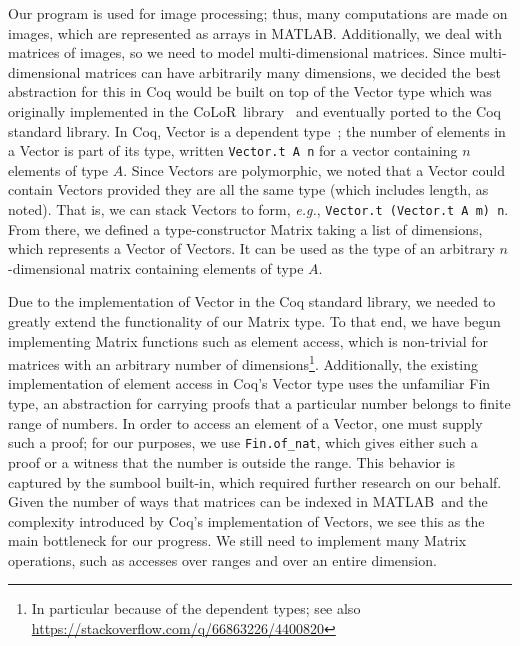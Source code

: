 \documentclass[11pt,conference]{IEEEtran}
\newcommand{\matlab}{MATLAB}
\newcommand{\colorlib}{CoLoR}
\theoremstyle{plain} %
\theoremstyle{definition}
\theoremstyle{remark}
\begin{document}
Our program is used for image processing; thus, many computations are made on
images, which are represented as arrays in \matlab\@. Additionally, we deal with
matrices of images, so we need to model multi-dimensional matrices. Since
multi-dimensional matrices can have arbitrarily many dimensions, we decided the
best abstraction for this in Coq would be built on top of the \textsf{Vector}
type which was originally implemented in the \colorlib\
library~\cite{BLANQUI_2011} and eventually ported to the Coq standard library.
In Coq, \textsf{Vector} is a dependent type~\cite{Bove2009,Thorsten_2010}; the
number of elements in a \textsf{Vector} is part of its type, written
\texttt{Vector.t A n} for a vector containing \(n\) elements of type \(A\).
Since \textsf{Vector}s are polymorphic, we noted that a \textsf{Vector} could
contain \textsf{Vector}s provided they are all the same type (which includes
length, as noted). That is, we can stack \textsf{Vector}s to form, \emph{e.g.},
\texttt{Vector.t (Vector.t A m) n}. From there, we defined a type-constructor
\textsf{Matrix} taking a list of dimensions, which represents a \textsf{Vector}
of \textsf{Vector}s. It can be used as the type of an arbitrary
\(n\)-dimensional matrix containing elements of type \(A\).

Due to the implementation of \textsf{Vector} in the Coq standard library, we
needed to greatly extend the functionality of our \textsf{Matrix} type. To that
end, we have begun implementing \textsf{Matrix} functions such as element
access, which is non-trivial for matrices with an arbitrary number of
dimensions\footnote{In particular because of the dependent types; see also
\url{https://stackoverflow.com/q/66863226/4400820}}. Additionally, the existing
implementation of element access in Coq's \textsf{Vector} type uses the
unfamiliar \textsf{Fin} type, an abstraction for carrying proofs that a
particular number belongs to finite range of numbers. In order to access an
element of a \textsf{Vector}, one must supply such a proof; for our purposes, we
use \texttt{Fin.of\_nat}, which gives either such a proof or a witness that the
number is outside the range. This behavior is captured by the \textsf{sumbool}
built-in, which required further research on our behalf. Given the number of
ways that matrices can be indexed in \matlab\ and the complexity introduced by
Coq's implementation of \textsf{Vector}s, we see this as the main bottleneck for
our progress. We still need to implement many \textsf{Matrix} operations, such
as accesses over ranges and over an entire dimension.
\end{document}
